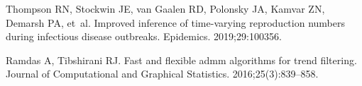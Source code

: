 \begin{thebibliography}{10}
Thompson RN, Stockwin JE, van Gaalen RD, Polonsky JA, Kamvar ZN, Demarsh PA,
  et~al.
\newblock Improved inference of time-varying reproduction numbers during
  infectious disease outbreaks.
\newblock Epidemics. 2019;29:100356.

Ramdas A, Tibshirani RJ.
\newblock Fast and flexible admm algorithms for trend filtering.
\newblock Journal of Computational and Graphical Statistics.
  2016;25(3):839--858.

\end{thebibliography}
